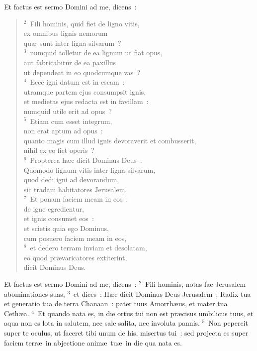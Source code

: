 \lettrine[lines=10,image=true,loversize=0.05,lraise=-0.03]{E}{}t factus est sermo Domini ad me, dicens~:
\begin{flushleft}\begin{verse}\vspace{6pt}${}^{2}$~Fili hominis, quid fiet de ligno vitis,\\ ex omnibus lignis nemorum\\ qu\ae\ sunt inter ligna silvarum~?\\
${}^{3}$~numquid tolletur de ea lignum ut fiat opus,\\ aut fabricabitur de ea paxillus\\ ut dependeat in eo quodcumque vas~?\\
${}^{4}$~Ecce igni datum est in escam~:\\ utramque partem ejus consumpsit ignis,\\ et medietas ejus redacta est in favillam~:\\ numquid utile erit ad opus~?\\
${}^{5}$~Etiam cum esset integrum,\\ non erat aptum ad opus~:\\ quanto magis cum illud ignis devoraverit et combusserit,\\ nihil ex eo fiet operis~?\\
${}^{6}$~Propterea h\ae c dicit Dominus Deus~:\\ Quomodo lignum vitis inter ligna silvarum,\\ quod dedi igni ad devorandum,\\ sic tradam habitatores Jerusalem.\\
${}^{7}$~Et ponam faciem meam in eos~:\\ de igne egredientur,\\ et ignis consumet eos~:\\ et scietis quia ego Dominus,\\ cum posuero faciem meam in eos,\\
${}^{8}$~et dedero terram inviam et desolatam,\\ eo quod pr\ae varicatores extiterint,\\ dicit Dominus Deus.\end{verse}\end{flushleft}



\lettrine[lines=10,image=true,loversize=0.05,lraise=-0.03]{E}{}t factus est sermo Domini ad me, dicens~:
${}^{2}$~Fili hominis, notas fac Jerusalem abominationes suas,
${}^{3}$~et dices~: H\ae c dicit Dominus Deus Jerusalem~: Radix tua et generatio tua de terra Chanaan~: pater tuus Amorrh\ae us, et mater tua Ceth\ae a.
${}^{4}$~Et quando nata es, in die ortus tui non est pr\ae cisus umbilicus tuus, et aqua non es lota in salutem, nec sale salita, nec involuta pannis.
${}^{5}$~Non pepercit super te oculus, ut faceret tibi unum de his, misertus tui~: sed projecta es super faciem terr\ae\ in abjectione anim\ae\ tu\ae\ in die qua nata es.


